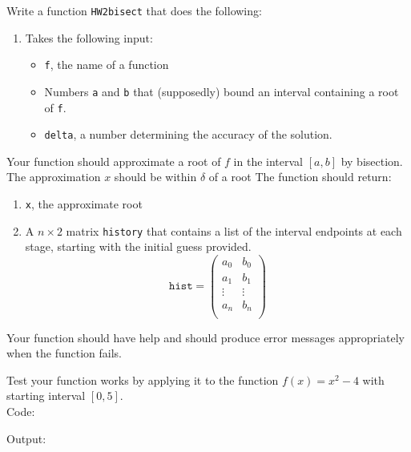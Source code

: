 \documentclass[12pt]{article}
\makeatletter
\theoremstyle{homework}
\newenvironment{exercise}[1]
{\def\@currentlabel{#1}\exercisecore}
{\endexercisecore}
\makeatother
\begin{document}
\begin{exercise}{DM 4}
Write a function \texttt{HW2bisect} that does the following:
\begin{enumerate}
	\item Takes the following input:
	\begin{itemize}
		\item \texttt{f}, the name of a function
		\item Numbers \texttt{a} and \texttt{b} that (supposedly) bound an interval containing a root of \texttt{f}.
		\item \texttt{delta}, a number determining the accuracy of the solution.
	\end{itemize}
\end{enumerate}
Your function should approximate a root of $f$ in the interval $[a,b]$ by 
bisection.  The approximation $x$ should be within $\delta$ of a root
The function should return:
\begin{enumerate}
	\item \texttt{x}, the approximate root
	\item A $n\times 2$ matrix \texttt{history} that contains
	a list of the interval endpoints at each stage, starting with the
	initial guess provided.
	\begin{equation}
	\mathtt{hist} = \begin{pmatrix} a_0 & b_0 \\
	a_1 & b_1 \\
	\vdots & \vdots \\
	a_n & b_n \\
	\end{pmatrix}
	\end{equation}
\end{enumerate}

Your function should have help and should produce error messages appropriately when the function fails.

Test your function works by applying it to the function $f(x)=x^2-4$ with starting interval $[0,5]$.\\

Code:


Output:


\end{exercise}
\end{document}
